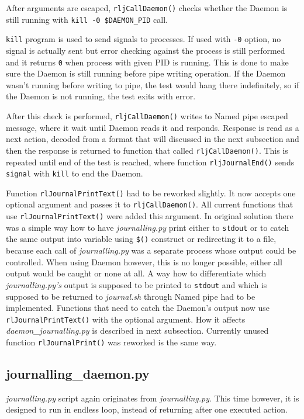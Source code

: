 After arguments are escaped, \texttt{rljCallDaemon()} checks whether the Daemon is still running with \texttt{kill -0 \$DAEMON\_PID} call. 

\texttt{kill} program is used to send signals to processes. If used with \texttt{-0} option, no signal is actually sent but error checking against the process is still performed and it returns \texttt{0} when process with given PID is running\cite{man_kill}. This is done to make sure the Daemon is still running before pipe writing operation.  If the Daemon wasn't running before writing to pipe, the test would hang there indefinitely, so if the Daemon is not running, the test exits with error.

After this check is performed, \texttt{rljCallDaemon()} writes to Named pipe escaped message, where it wait until Daemon reads it and responds. Response is read as a next action, decoded from a format that will discussed in the next subsection and then the response is returned to function that called \texttt{rljCallDaemon()}. 
This is repeated until end of the test is reached, where function \texttt{rljJournalEnd()} sends \texttt{signal} with \texttt{kill} to end the Daemon.

Function \texttt{rlJournalPrintText()} had to be reworked slightly. It now accepts one optional argument and passes it to \texttt{rljCallDaemon()}. All current functions that use \texttt{rlJournalPrintText()} were added this argument. In original solution there was a simple way how to have \textit{journalling.py} print either to \texttt{stdout} or to catch the same output into variable using  \texttt{\$()} construct or redirecting it to a file, because each call of  \textit{journalling.py} was a separate process whose output could be controlled. When using Daemon however, this is no longer possible, either all output would be caught or none at all.
A way how to differentiate which \textit{journalling.py's} output is supposed to be printed to \texttt{stdout} and which is supposed to be returned to \textit{journal.sh} through Named pipe had to be implemented. Functions that need to catch the Daemon's output now use  \texttt{rlJournalPrintText()} with the optional argument. How it affects \textit{daemon\_journalling.py} is described in next subsection.
Currently unused function \texttt{rlJournalPrint()} was reworked is the same way.

\subsection{journalling\_daemon.py}
\textit{journalling.py} script again originates from \textit{journalling.py}. This time however, it is designed to run in endless loop, instead of returning after one executed action.

